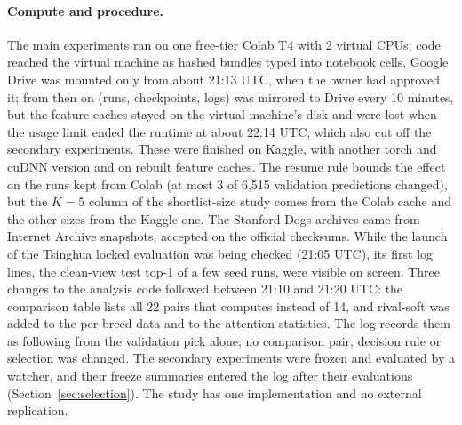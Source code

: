 \documentclass[11pt,a4paper]{article}
\theoremstyle{plain}
\newcommand{\fn}[1]{\texttt{\detokenize{#1}}}
\begin{document}
\paragraph{Compute and procedure.} The main experiments ran on one free-tier Colab T4 with 2 virtual CPUs; code
reached the virtual machine as hashed bundles typed into notebook cells. Google Drive was mounted only from about 21:13 UTC, when the
owner had approved it; from then on \fn{/content/work} (runs, checkpoints, logs) was mirrored to Drive every 10
minutes, but the feature caches stayed on the virtual machine's disk and were lost when the usage limit ended the
runtime at about 22:14 UTC, which also cut off the secondary experiments. These were finished on Kaggle, with another
torch and cuDNN version and on rebuilt feature caches. The resume rule bounds the effect on the runs kept from Colab
(at most 3 of 6,515 validation predictions changed), but the $K=5$ column of the shortlist-size study comes from the
Colab cache and the other sizes from the Kaggle one. The Stanford Dogs archives came from Internet
Archive snapshots, accepted on the official checksums. While the launch of the Tsinghua locked evaluation was being
checked (21:05 UTC), its first log lines, the clean-view test top-1 of a few seed runs, were visible on screen.
Three changes to the analysis code followed between 21:10 and 21:20 UTC: the comparison table lists all 22 pairs
that \fn{final_all.sh} computes instead of 14, and rival-soft was added to the per-breed data and to the attention
statistics. The log records them as following from the validation pick alone; no comparison pair, decision rule or
selection was changed. The secondary experiments were frozen and evaluated by a watcher, and their freeze summaries
entered the log after their evaluations (Section~\ref{sec:selection}). The study has one implementation and no
external replication.

\end{document}
